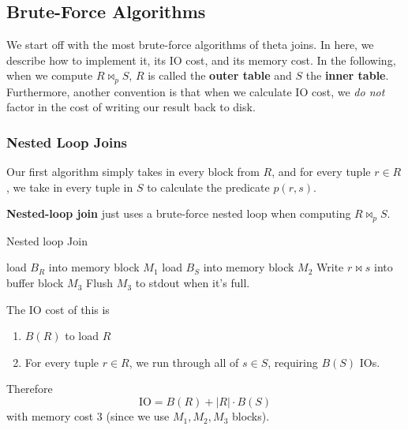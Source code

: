 \subsection{Brute-Force Algorithms}  

  We start off with the most brute-force algorithms of theta joins. In here, we describe how to implement it, its IO cost, and its memory cost. In the following, when we compute $R \bowtie_p S$, $R$ is called the \textbf{outer table} and $S$ the \textbf{inner table}. Furthermore, another convention is that when we calculate IO cost, we \textit{do not} factor in the cost of writing our result back to disk.  

  \subsubsection{Nested Loop Joins} 

    Our first algorithm simply takes in every block from $R$, and for every tuple $r \in R$, we take in every tuple in $S$ to calculate the predicate $p(r, s)$. 

    \begin{algo}
      \textbf{Nested-loop join} just uses a brute-force nested loop when computing $R \bowtie_p S$. 
      \begin{algorithm}[H]
        \caption{Nested loop Join}
        \begin{algorithmic}
              \State load $B_R$ into memory block $M_1$
                  \State load $B_S$ into memory block $M_2$
                      \State Write $r \bowtie s$ into buffer block $M_3$ 
                      \State Flush $M_3$ to stdout when it's full. 
                    \EndIf
                  \EndFor
                \EndFor
              \EndFor
            \EndFor
          \EndFunction
        \end{algorithmic}
      \end{algorithm} 
      The IO cost of this is 
      \begin{enumerate}
        \item $B(R)$ to load $R$ 
        \item For every tuple $r \in R$, we run through all of $s \in S$, requiring $B(S)$ IOs.
      \end{enumerate} 
      Therefore
      \begin{equation}
        \mathrm{IO} = B(R) + |R| \cdot B(S)
      \end{equation}
      with memory cost $3$ (since we use $M_1, M_2, M_3$ blocks).
    \end{algo}

